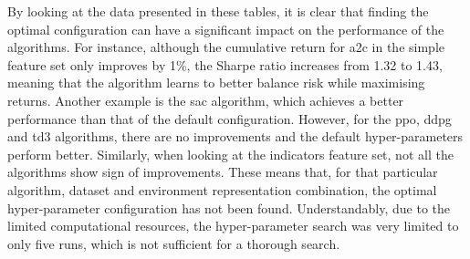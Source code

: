 


By looking at the data presented in these tables, it is clear that finding the optimal configuration can have a significant impact on the performance of the algorithms. For instance, although the cumulative return for \acrshort{a2c} in the simple feature set only improves by 1\%, the Sharpe ratio increases from 1.32 to 1.43, meaning that the algorithm learns to better balance risk while maximising returns. Another example is the \acrshort{sac} algorithm, which achieves a better performance than that of the default configuration. However, for the \acrshort{ppo}, \acrshort{ddpg} and \acrshort{td3} algorithms, there are no improvements and the default hyper-parameters perform better. Similarly, when looking at the indicators feature set, not all the algorithms show sign of improvements. These means that, for that particular algorithm, dataset and environment representation combination, the optimal hyper-parameter configuration has not been found. Understandably, due to the limited computational resources, the hyper-parameter search was very limited to only five runs, which is not sufficient for a thorough search.
